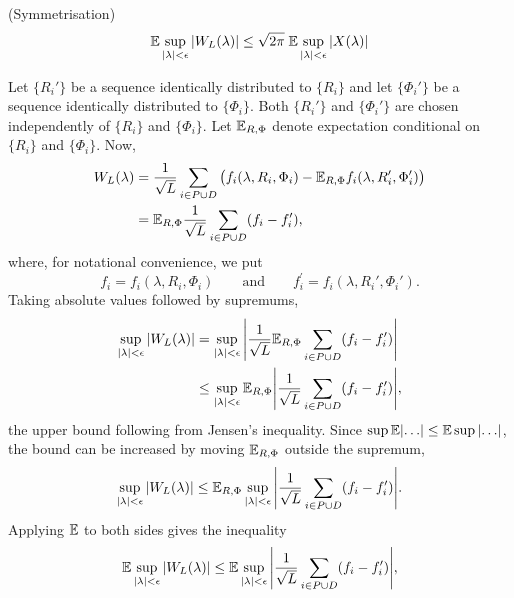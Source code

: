 \documentclass[journal]{IEEEtran}
\begin{document}
\begin{lemma}\label{lem:symmetrisation} (Symmetrisation)
\[
{\mathbb E} \sup_{{\vert \lambda \vert} < \epsilon} {\left\vert  W_L(\lambda) \right\vert} \leq \sqrt{2\pi} \; {\mathbb E} \sup_{{\vert \lambda \vert} < \epsilon}  {\left\vert  X(\lambda)  \right\vert}
\]
\end{lemma}
\begin{IEEEproof}
Let $\{R_i'\}$ be a sequence identically distributed to $\{R_i\}$ and let $\{\Phi_i'\}$ be a sequence identically distributed to $\{\Phi_i\}$.  Both $\{R_i'\}$ and $\{\Phi_i'\}$ are chosen independently of $\{R_i\}$ and $\{\Phi_i\}$.  Let ${\mathbb E}_{R,\Phi}$ denote expectation conditional on $\{R_i\}$ and $\{\Phi_i\}$.  Now,
\begin{align*}
W_L(\lambda) &= \frac{1}{\sqrt{L}} \sum_{i \in P \cup D} \big( f_i(\lambda, R_i, \Phi_i) - {\mathbb E}_{R,\Phi} f_i(\lambda, R_i', \Phi_i') \big) \\
&= {\mathbb E}_{R,\Phi} \frac{1}{\sqrt{L}} \sum_{i \in P \cup D} ( f_{i} - f_{i}^\prime ),
\end{align*}
where, for notational convenience, we put 
\[
f_{i} = f_i(\lambda, R_i, \Phi_i) \qquad \text{and} \qquad  f_{i}^\prime = f_i(\lambda, R_i', \Phi_i').
\] 
Taking absolute values followed by supremums,
\begin{align*}
 \sup_{{\vert \lambda \vert} < \epsilon} {\left\vert  W_L(\lambda) \right\vert} &= \sup_{{\vert \lambda \vert} < \epsilon}  {\left\vert \frac{1}{\sqrt{L}} {\mathbb E}_{R,\Phi} \sum_{i \in P \cup D} (f_{i} - f_{i}^\prime ) \right\vert} \\
&\leq \sup_{{\vert \lambda \vert} < \epsilon} {\mathbb E}_{R,\Phi}  {\left\vert  \frac{1}{\sqrt{L}} \sum_{i \in P \cup D}  (f_{i} - f_{i}^\prime)  \right\vert},
\end{align*}
the upper bound following from Jensen's inequality.  Since $\sup \expect \abs{\dots} \leq \expect \sup \abs{\dots}$, the bound can be increased by moving ${\mathbb E}_{R,\Phi}$ outside the supremum,
\begin{equation}\label{eq:Eoutsidesup}
 \sup_{{\vert \lambda \vert} < \epsilon} {\left\vert  W_L(\lambda) \right\vert} \leq {\mathbb E}_{R,\Phi} \sup_{{\vert \lambda \vert} < \epsilon} {\left\vert  \frac{1}{\sqrt{L}}\sum_{i \in P \cup D} ( f_{i} - f_{i}^\prime )  \right\vert}.
\end{equation}
Applying ${\mathbb E}$ to both sides gives the inequality
\begin{equation}\label{eq:Gninequfin}
 {\mathbb E} \sup_{{\vert \lambda \vert} < \epsilon} {\left\vert  W_L(\lambda) \right\vert} \leq  {\mathbb E} \sup_{{\vert \lambda \vert} < \epsilon} {\left\vert  \frac{1}{\sqrt{L}}\sum_{i \in P \cup D} (f_{i} - f_{i}^\prime)  \right\vert},
\end{equation}

\end{IEEEproof}
\end{document}
